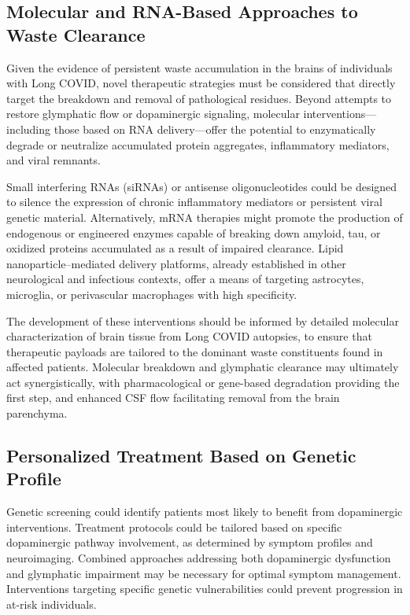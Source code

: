 \documentclass[12pt]{article}
\begin{document}
\subsection*{Molecular and RNA-Based Approaches to Waste Clearance}

Given the evidence of persistent waste accumulation in the brains of individuals with Long COVID, novel therapeutic strategies must be considered that directly target the breakdown and removal of pathological residues. Beyond attempts to restore glymphatic flow or dopaminergic signaling, molecular interventions—including those based on RNA delivery—offer the potential to enzymatically degrade or neutralize accumulated protein aggregates, inflammatory mediators, and viral remnants.

Small interfering RNAs (siRNAs) or antisense oligonucleotides could be designed to silence the expression of chronic inflammatory mediators or persistent viral genetic material. Alternatively, mRNA therapies might promote the production of endogenous or engineered enzymes capable of breaking down amyloid, tau, or oxidized proteins accumulated as a result of impaired clearance. Lipid nanoparticle–mediated delivery platforms, already established in other neurological and infectious contexts, offer a means of targeting astrocytes, microglia, or perivascular macrophages with high specificity.

The development of these interventions should be informed by detailed molecular characterization of brain tissue from Long COVID autopsies, to ensure that therapeutic payloads are tailored to the dominant waste constituents found in affected patients. Molecular breakdown and glymphatic clearance may ultimately act synergistically, with pharmacological or gene-based degradation providing the first step, and enhanced CSF flow facilitating removal from the brain parenchyma.

\subsection*{Personalized Treatment Based on Genetic Profile}

Genetic screening could identify patients most likely to benefit from dopaminergic interventions. Treatment protocols could be tailored based on specific dopaminergic pathway involvement, as determined by symptom profiles and neuroimaging. Combined approaches addressing both dopaminergic dysfunction and glymphatic impairment may be necessary for optimal symptom management. Interventions targeting specific genetic vulnerabilities could prevent progression in at-risk individuals.
\end{document}
